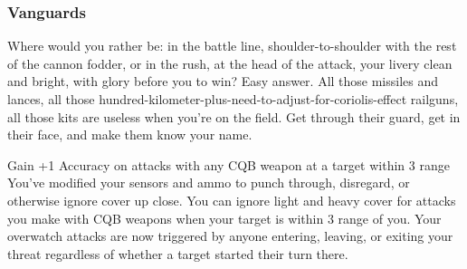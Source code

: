 \subsubsection{Vanguards}

\begin{talent}
{Where would you rather be: in the battle line, shoulder-to-shoulder with the rest of the cannon fodder, or in the rush, at the head of the attack, your livery clean and bright, with glory before you to win? Easy answer. All those missiles and lances, all those hundred-kilometer-plus-need-to-adjust-for-coriolis-effect railguns, all those kits are useless when you’re on the field. Get through their guard, get in their face, and make them know your name.}

Gain +1 Accuracy on attacks with any CQB weapon at a target within 3 range 
You’ve modified your sensors and ammo to punch through, disregard, or otherwise ignore cover up close. You can ignore light and heavy cover for attacks you make with CQB weapons when your target is within 3 range of you. 
Your overwatch attacks are now triggered by anyone entering, leaving, or exiting your threat regardless of whether a target started their turn there.
\end{talent}